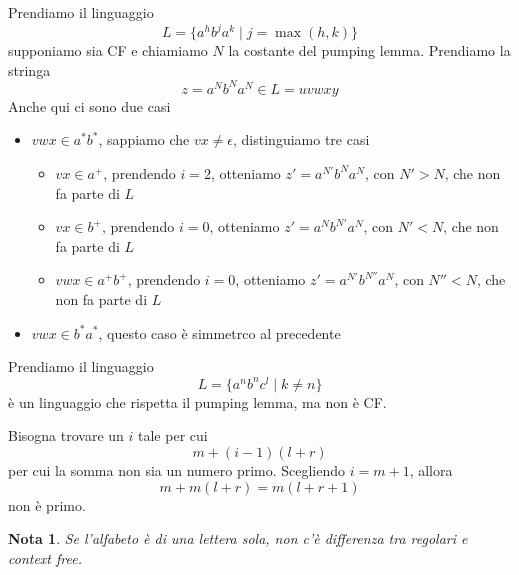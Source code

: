 \documentclass[12pt]{report}
\newtheorem{nota}{Nota}
\begin{document}
\begin{tcolorbox}[breakable]
	Prendiamo il linguaggio
	$$ L = \{ a^h b^j a^k \mid j = \max(h, k) \} $$
	supponiamo sia CF e chiamiamo $N$ la costante del pumping lemma.
	Prendiamo la stringa
	$$ z = a^N b^N a^N  \in L = u v w x y $$
	Anche qui ci sono due casi
	\begin{itemize}
		\item $vwx \in a^* b^*$, sappiamo che $vx \neq \epsilon$, distinguiamo tre casi
			\begin{itemize}
				\item $vx \in a^+$, prendendo $i = 2$, otteniamo $z' = a^{N'} b^N a^N$, con $N' > N$, che non fa parte di $L$
				\item $vx \in b^+$, prendendo $i = 0$, otteniamo $z' = a^N b^{N'} a^N$, con $N' < N$, che non fa parte di $L$
				\item $vwx \in a^+b^+$, prendendo $i = 0$, otteniamo $z' = a^{N'} b^{N''} a^N$, con $N'' < N$, che non fa parte di $L$
			\end{itemize}
		\item $vwx \in b^* a^*$, questo caso è simmetrco al precedente
	\end{itemize}
\end{tcolorbox}

\begin{tcolorbox}
	Prendiamo il linguaggio
	$$ L = \{ a^n b^n c^l \mid k \neq n \} $$
	è un linguaggio che rispetta il pumping lemma, ma non è CF.
\end{tcolorbox}

Bisogna trovare un $i$ tale per cui 
$$ m + (i - 1)(l + r) $$
per cui la somma non sia un numero primo.
Scegliendo $i = m + 1$, allora 
$$ m + m(l + r) = m(l + r + 1) $$
non è primo.

\begin{nota}
Se l'alfabeto è di una lettera sola, non c'è differenza tra regolari e context free.
\end{nota}
\end{document}
